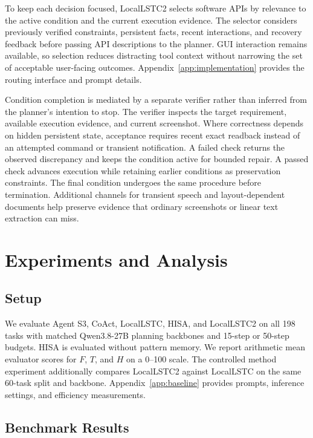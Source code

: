 \documentclass[11pt]{article}
\begin{document}
To keep each decision focused, LocalLSTC2 selects software APIs by relevance to the active condition and the current execution evidence. The selector considers previously verified constraints, persistent facts, recent interactions, and recovery feedback before passing API descriptions to the planner. GUI interaction remains available, so selection reduces distracting tool context without narrowing the set of acceptable user-facing outcomes. Appendix~\ref{app:implementation} provides the routing interface and prompt details.

Condition completion is mediated by a separate verifier rather than inferred from the planner's intention to stop. The verifier inspects the target requirement, available execution evidence, and current screenshot. Where correctness depends on hidden persistent state, acceptance requires recent exact readback instead of an attempted command or transient notification. A failed check returns the observed discrepancy and keeps the condition active for bounded repair. A passed check advances execution while retaining earlier conditions as preservation constraints. The final condition undergoes the same procedure before termination. Additional channels for transient speech and layout-dependent documents help preserve evidence that ordinary screenshots or linear text extraction can miss.

\section{Experiments and Analysis}

\subsection{Setup}

We evaluate Agent S3, CoAct, LocalLSTC, HISA, and LocalLSTC2 on all 198 tasks with matched Qwen3.8-27B planning backbones and 15-step or 50-step budgets. HISA is evaluated without pattern memory. We report arithmetic mean evaluator scores for $F$, $T$, and $H$ on a 0--100 scale. The controlled method experiment additionally compares LocalLSTC2 against LocalLSTC on the same 60-task split and backbone. Appendix~\ref{app:baseline} provides prompts, inference settings, and efficiency measurements.

\subsection{Benchmark Results}
\end{document}
